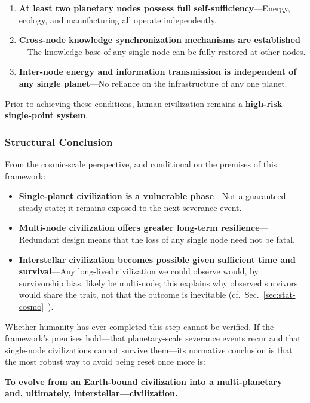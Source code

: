 \documentclass[aps,prd,twocolumn,superscriptaddress,nofootinbib]{revtex4-2}
\begin{document}
\begin{enumerate}
  \item \textbf{At least two planetary nodes possess full self-sufficiency}---Energy, ecology, and manufacturing all operate independently.
  \item \textbf{Cross-node knowledge synchronization mechanisms are established}---The knowledge base of any single node can be fully restored at other nodes.
  \item \textbf{Inter-node energy and information transmission is independent of any single planet}---No reliance on the infrastructure of any one planet.
\end{enumerate}

Prior to achieving these conditions, human civilization remains a \textbf{high-risk single-point system}.

\subsubsection{Structural Conclusion}\label{sec:structural-conclusion}

From the cosmic-scale perspective, and conditional on the premises of this framework:

\begin{itemize}
  \item \textbf{Single-planet civilization is a vulnerable phase}---Not a guaranteed steady state; it remains exposed to the next severance event.
  \item \textbf{Multi-node civilization offers greater long-term resilience}---Redundant design means that the loss of any single node need not be fatal.
  \item \textbf{Interstellar civilization becomes possible given sufficient time and survival}---Any long-lived civilization we could observe would, by survivorship bias, likely be multi-node; this explains why observed survivors would share the trait, not that the outcome is inevitable (cf.\ Sec.~\ref{sec:stat-cosmo}~\cite{Sandberg2018}).
\end{itemize}

Whether humanity has ever completed this step cannot be verified. If the framework's premises hold---that planetary-scale severance events recur and that single-node civilizations cannot survive them---its normative conclusion is that the most robust way to avoid being reset once more is:

\textbf{To evolve from an Earth-bound civilization into a multi-planetary---and, ultimately, interstellar---civilization.}
\end{document}
